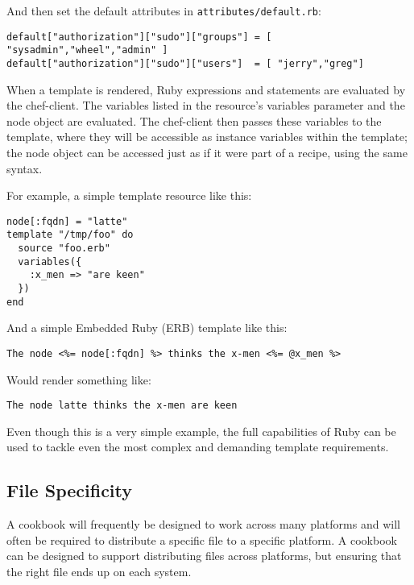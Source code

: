 And then set the default attributes in \lstinline!attributes/default.rb!:

\begin{lstlisting}[label=lst:cookbook-templates3]
default["authorization"]["sudo"]["groups"] = [ "sysadmin","wheel","admin" ]
default["authorization"]["sudo"]["users"]  = [ "jerry","greg"]
\end{lstlisting}

When a template is rendered, Ruby expressions and statements are evaluated by the chef-client. The variables listed in the resource’s variables parameter and the node object are evaluated. The chef-client then passes these variables to the template, where they will be accessible as instance variables within the template; the node object can be accessed just as if it were part of a recipe, using the same syntax.

For example, a simple template resource like this:

\begin{lstlisting}[label=lst:cookbook-templates4]
node[:fqdn] = "latte"
template "/tmp/foo" do
  source "foo.erb"
  variables({
    :x_men => "are keen"
  })
end
\end{lstlisting}

And a simple Embedded Ruby (ERB) template like this:

\begin{lstlisting}[label=lst:cookbook-templates5]
The node <%= node[:fqdn] %> thinks the x-men <%= @x_men %>
\end{lstlisting}

Would render something like:

\begin{lstlisting}[label=lst:cookbook-templates6]
The node latte thinks the x-men are keen
\end{lstlisting}

Even though this is a very simple example, the full capabilities of Ruby can be used to tackle even the most complex and demanding template requirements.

\subsection{File Specificity}

A cookbook will frequently be designed to work across many platforms and will often be required to distribute a specific file to a specific platform. A cookbook can be designed to support distributing files across platforms, but ensuring that the right file ends up on each system.

